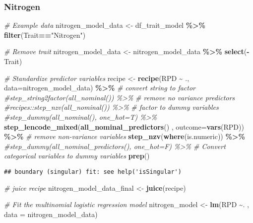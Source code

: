 \documentclass[
]{article}
\newenvironment{Shaded}{\begin{snugshade}}{\end{snugshade}}
\newcommand{\AttributeTok}[1]{\textcolor[rgb]{0.13,0.29,0.53}{#1}}
\newcommand{\CommentTok}[1]{\textcolor[rgb]{0.56,0.35,0.01}{\textit{#1}}}
\newcommand{\FunctionTok}[1]{\textcolor[rgb]{0.13,0.29,0.53}{\textbf{#1}}}
\newcommand{\NormalTok}[1]{#1}
\newcommand{\OtherTok}[1]{\textcolor[rgb]{0.56,0.35,0.01}{#1}}
\newcommand{\SpecialCharTok}[1]{\textcolor[rgb]{0.81,0.36,0.00}{\textbf{#1}}}
\newcommand{\StringTok}[1]{\textcolor[rgb]{0.31,0.60,0.02}{#1}}
\begin{document}
\hypertarget{nitrogen}{%
\subsubsection{Nitrogen}\label{nitrogen}}

\begin{Shaded}
\begin{Highlighting}[]
\CommentTok{\# Example data}
\NormalTok{nitrogen\_model\_data }\OtherTok{\textless{}{-}}\NormalTok{ df\_trait\_model }\SpecialCharTok{\%\textgreater{}\%} \FunctionTok{filter}\NormalTok{(Trait}\SpecialCharTok{==}\StringTok{"Nitrogen"}\NormalTok{)}

\CommentTok{\# Remove trait}
\NormalTok{nitrogen\_model\_data }\OtherTok{\textless{}{-}}\NormalTok{ nitrogen\_model\_data }\SpecialCharTok{\%\textgreater{}\%} \FunctionTok{select}\NormalTok{(}\SpecialCharTok{{-}}\NormalTok{Trait)}

\CommentTok{\# Standardize predictor variables}
\NormalTok{recipe }\OtherTok{\textless{}{-}} \FunctionTok{recipe}\NormalTok{(RPD }\SpecialCharTok{\textasciitilde{}}\NormalTok{ ., }\AttributeTok{data=}\NormalTok{nitrogen\_model\_data) }\SpecialCharTok{\%\textgreater{}\%}
    \CommentTok{\# convert string to factor}
    \CommentTok{\#step\_string2factor(all\_nominal()) \%\textgreater{}\%}
    \CommentTok{\# remove no variance predictors }
    \CommentTok{\#recipes::step\_nzv(all\_nominal()) \%\textgreater{}\%}
    \CommentTok{\# factor to  dummy variables}
    \CommentTok{\#step\_dummy(all\_nominal(), one\_hot=T) \%\textgreater{}\%}
    \FunctionTok{step\_lencode\_mixed}\NormalTok{(}\FunctionTok{all\_nominal\_predictors}\NormalTok{() , }\AttributeTok{outcome=}\FunctionTok{vars}\NormalTok{(RPD)) }\SpecialCharTok{\%\textgreater{}\%}
    \CommentTok{\# remove non{-}variance variables}
    \FunctionTok{step\_nzv}\NormalTok{(}\FunctionTok{where}\NormalTok{(is.numeric)) }\SpecialCharTok{\%\textgreater{}\%}
    \CommentTok{\#step\_dummy(all\_nominal\_predictors(), one\_hot=F) \%\textgreater{}\%  \# Convert categorical   variables to dummy variables}
    \FunctionTok{prep}\NormalTok{()}
\end{Highlighting}
\end{Shaded}

\begin{verbatim}
## boundary (singular) fit: see help('isSingular')
\end{verbatim}

\begin{Shaded}
\begin{Highlighting}[]
\CommentTok{\# juice recipe}
\NormalTok{nitrogen\_model\_data\_final }\OtherTok{\textless{}{-}} \FunctionTok{juice}\NormalTok{(recipe)}

\CommentTok{\# Fit the multinomial logistic regression model}
\NormalTok{nitrogen\_model }\OtherTok{\textless{}{-}} \FunctionTok{lm}\NormalTok{(RPD }\SpecialCharTok{\textasciitilde{}}\NormalTok{. , }\AttributeTok{data =}\NormalTok{ nitrogen\_model\_data)}
\end{Highlighting}
\end{Shaded}
\end{document}
